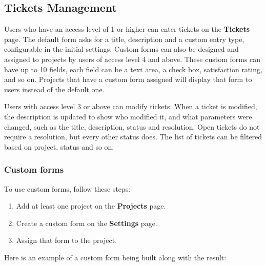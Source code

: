 \documentclass[11pt]{article}
\begin{document}
\subsection{Tickets Management}
Users who have an access level of 1 or higher can enter tickets on the \textbf{Tickets} page. The default form asks for a title, description and a custom entry type, configurable in the initial settings. Custom forms can also be designed and assigned to projects by users of access level 4 and above. These custom forms can have up to 10 fields, each field can be a text area, a check box, satisfaction rating, and so on. Projects that have a custom form assigned will display that form to users instead of the default one.

Users with access level 3 or above can modify tickets. When a ticket is modified, the description is updated to show who modified it, and what parameters were changed, such as the title, description, status and resolution. Open tickets do not require a resolution, but every other status does. The list of tickets can be filtered based on project, status and so on.

\subsubsection{Custom forms}
To use custom forms, follow these steps:

\begin{enumerate}
\item Add at least one project on the \textbf{Projects} page.
\item Create a custom form on the \textbf{Settings} page.
\item Assign that form to the project.
\end{enumerate}

Here is an example of a custom form being built along with the result:
\end{document}
